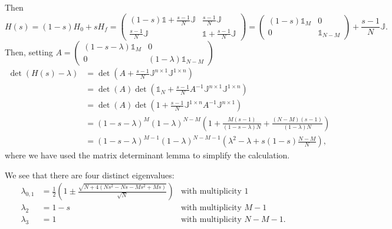 Then
\[ H(s) = (1-s)H_0 + sH_f = \begin{pmatrix}
(1-s)\mathbb{1} +\frac{s-1}{N}\mathbb{J} & \frac{s-1}{N}\mathbb{J} \\
\frac{s-1}{N}\mathbb{J} & \mathbb{1} + \frac{s-1}{N}\mathbb{J}
\end{pmatrix} = \begin{pmatrix}
(1-s)\mathbb{1}_M & 0 \\ 0 & \mathbb{1}_{N-M}
\end{pmatrix} + \frac{s-1}{N}\mathbb{J}. \]
Then, setting $A = \begin{pmatrix}
(1-s-\lambda)\mathbb{1}_M & 0 \\ 0 & (1-\lambda)\mathbb{1}_{N-M}
\end{pmatrix}$
\begin{align*}
\det(H(s)-\lambda) &= \det \left(A + \frac{s-1}{N}\mathbb{J}^{n\times 1}\mathbb{J}^{1\times n}\right) \\
&= \det(A)\det \left(\mathbb{1}_N + \frac{s-1}{N}A^{-1}\mathbb{J}^{n\times 1}\mathbb{J}^{1\times n}\right) \\
&= \det(A)\det \left(1 + \frac{s-1}{N}\mathbb{J}^{1\times n}A^{-1}\mathbb{J}^{n\times 1}\right) \\
&= (1-s-\lambda)^{M}(1-\lambda)^{N-M}\left(1 + \frac{M(s-1)}{(1-s-\lambda)N} + \frac{(N-M)(s-1)}{(1-\lambda)N}\right) \\
&= (1-s-\lambda)^{M-1}(1-\lambda)^{N-M-1}\left(\lambda^2 - \lambda + s(1-s)\frac{N-M}{N}\right),
\end{align*}
where we have used the matrix determinant lemma to simplify the calculation.

We see that there are four distinct eigenvalues:
\begin{align*}
\lambda_{0,1} &= \frac{1}{2}\left(1\pm \frac{\sqrt{N+4(Ns^2-Ns-Ms^2+Ms)}}{\sqrt{N}}\right) &\text{with multiplicity $1$}\\
\lambda_{2} &= 1-s &\text{with multiplicity $M-1$}\\
\lambda_{3} &= 1 &\text{with multiplicity $N-M-1$.}
\end{align*}

